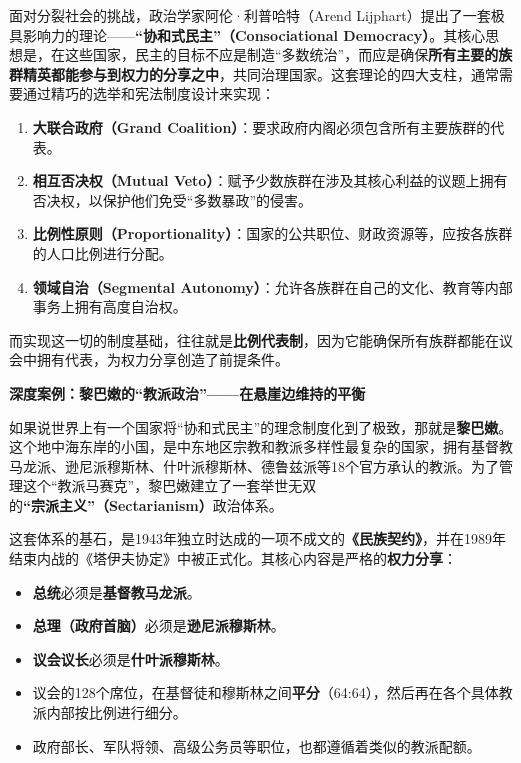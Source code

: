 面对分裂社会的挑战，政治学家阿伦·利普哈特（Arend Lijphart）提出了一套极具影响力的理论——\textbf{“协和式民主”（Consociational Democracy）}。其核心思想是，在这些国家，民主的目标不应是制造“多数统治”，而应是确保\textbf{所有主要的族群精英都能参与到权力的分享之中}，共同治理国家。这套理论的四大支柱，通常需要通过精巧的选举和宪法制度设计来实现：

\begin{enumerate}
    \item \textbf{大联合政府（Grand Coalition）}：要求政府内阁必须包含所有主要族群的代表。
    \item \textbf{相互否决权（Mutual Veto）}：赋予少数族群在涉及其核心利益的议题上拥有否决权，以保护他们免受“多数暴政”的侵害。
    \item \textbf{比例性原则（Proportionality）}：国家的公共职位、财政资源等，应按各族群的人口比例进行分配。
    \item \textbf{领域自治（Segmental Autonomy）}：允许各族群在自己的文化、教育等内部事务上拥有高度自治权。
\end{enumerate}

而实现这一切的制度基础，往往就是\textbf{比例代表制}，因为它能确保所有族群都能在议会中拥有代表，为权力分享创造了前提条件。

\textbf{深度案例：黎巴嫩的“教派政治”——在悬崖边维持的平衡}

如果说世界上有一个国家将“协和式民主”的理念制度化到了极致，那就是\textbf{黎巴嫩}。这个地中海东岸的小国，是中东地区宗教和教派多样性最复杂的国家，拥有基督教马龙派、逊尼派穆斯林、什叶派穆斯林、德鲁兹派等18个官方承认的教派。为了管理这个“教派马赛克”，黎巴嫩建立了一套举世无双的\textbf{“宗派主义”（Sectarianism）}政治体系。

这套体系的基石，是1943年独立时达成的一项不成文的\textbf{《民族契约》}，并在1989年结束内战的《塔伊夫协定》中被正式化。其核心内容是严格的\textbf{权力分享}：

\begin{itemize}
    \item \textbf{总统}必须是\textbf{基督教马龙派}。
    \item \textbf{总理（政府首脑）}必须是\textbf{逊尼派穆斯林}。
    \item \textbf{议会议长}必须是\textbf{什叶派穆斯林}。
    \item 议会的128个席位，在基督徒和穆斯林之间\textbf{平分}（64:64），然后再在各个具体教派内部按比例进行细分。
    \item 政府部长、军队将领、高级公务员等职位，也都遵循着类似的教派配额。
\end{itemize}

